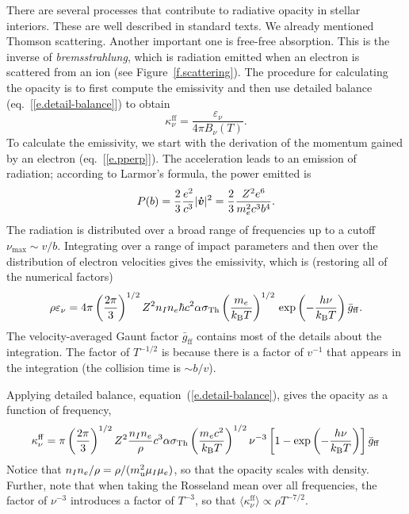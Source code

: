 There are several processes that contribute to radiative opacity in stellar interiors.  These are well described in standard texts. We already mentioned Thomson scattering. Another important one is free-free absorption. This is the inverse of \emph{bremsstrahlung}, which is radiation emitted when an electron is scattered from an ion (see Figure~\ref{f.scattering}). The procedure for calculating the opacity is to first compute the emissivity and then use detailed balance (eq.~[\ref{e.detail-balance}]) to obtain
\[ \kappa_{\nu}^{\mathrm{ff}} = \frac{\varepsilon_{\nu}}{4\pi B_{\nu}(T)} . \] 
To calculate the emissivity, we start with the derivation of the momentum gained by an electron (eq.~[\ref{e.pperp}]).  The acceleration leads to an emission of radiation; according to Larmor's formula, the power emitted is
\begin{equation}\label{e.larmor}
P(b) = \frac{2}{3}\frac{e^{2}}{c^{3}} |\boldsymbol{\dot{v}}|^{2} = \frac{2}{3}\frac{Z^{2}e^{6}}{m_{e}^{2}c^{3}b^{4}}.
\end{equation}
The radiation is distributed over a broad range of frequencies up to a cutoff $\nu_{\max}\sim v/b$. Integrating over a range of impact parameters and then over the distribution of electron velocities gives the emissivity, which is (restoring all of the numerical factors)
\begin{equation}\label{e.free-free-w}
\rho \varepsilon_{\nu} = 4\pi\left(\frac{2\pi}{3}\right)^{1/2}Z^{2}n_{I}n_{e} \hbar c^{2}  \alpha \sigma_{\mathrm{Th}} \left(\frac{m_{e}}{k_\mathrm{B} T}\right)^{1/2}\,\exp\left(-\frac{h\nu}{k_\mathrm{B} T}\right) \bar{g}_{\mathrm{ff}}.
\end{equation}
The velocity-averaged Gaunt factor $\bar{g}_{\mathrm{ff}}$ contains most of the details about the integration. The factor of $T^{-1/2}$ is because there is a factor of $v^{-1}$ that appears in the integration (the collision time is $\sim b/v$).  

Applying detailed balance, equation~(\ref{e.detail-balance}), gives the opacity as a function of frequency,
\begin{equation}\label{e.free-free-opacity}
\kappa^{\mathrm{ff}}_{\nu} = \pi\left(\frac{2\pi}{3}\right)^{1/2}Z^{2}\frac{n_{I}n_{e}}{\rho}c^{3}\alpha \sigma_{\mathrm{Th}} \left(\frac{m_{e}c^{2}}{k_\mathrm{B} T}\right)^{1/2} \nu^{-3} \left[ 1- \exp\left(-\frac{h\nu}{k_\mathrm{B} T}\right)  \right] \bar{g}_{\mathrm{ff}}
\end{equation}
Notice that $n_{I}n_{e}/\rho = \rho/(m_\mathrm{u}^{2}\mu_{I}\mu_{e})$, so that the opacity scales with density.  Further, note that when taking the Rosseland mean over all frequencies, the factor of $\nu^{-3}$ introduces a factor of $T^{-3}$, so that $\langle\kappa^{\mathrm{ff}}_{\nu}\rangle \propto \rho T^{-7/2}$.

